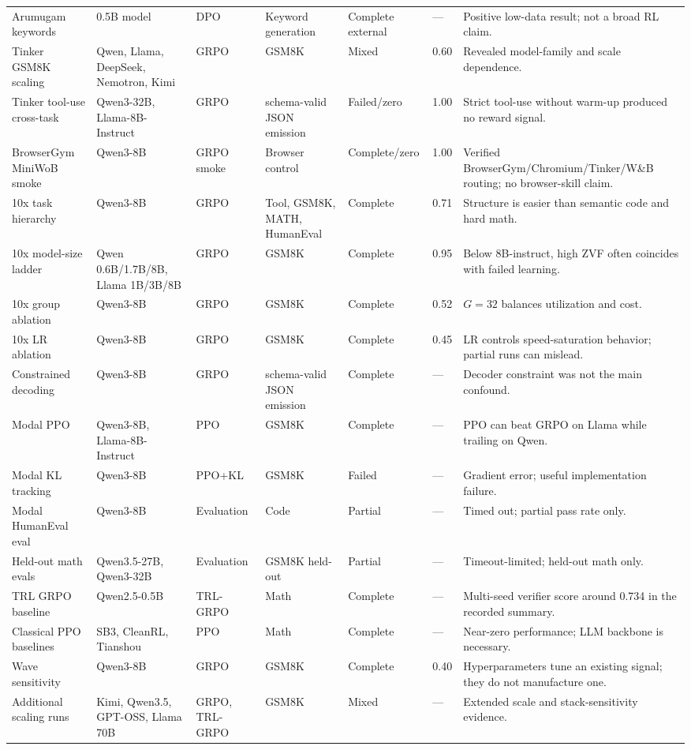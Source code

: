 \documentclass[12pt,a4paper]{report}
\begin{document}
\begin{landscape}
\begin{longtable}{p{3.2cm}p{3.0cm}p{2.5cm}p{2.2cm}p{1.8cm}p{1.5cm}p{4.8cm}}
Arumugam keywords & 0.5B model & DPO & Keyword generation & Complete external & --- & Positive low-data result; not a broad RL claim.\\
Tinker GSM8K scaling & Qwen, Llama, DeepSeek, Nemotron, Kimi & GRPO & GSM8K & Mixed & 0.60 & Revealed model-family and scale dependence.\\
Tinker tool-use cross-task & Qwen3-32B, Llama-8B-Instruct & GRPO & schema-valid JSON emission & Failed/\allowbreak zero & 1.00 & Strict tool-use without warm-up produced no reward signal.\\
BrowserGym MiniWoB smoke & Qwen3-8B & GRPO smoke & Browser control & Complete/\allowbreak zero & 1.00 & Verified BrowserGym/Chromium/Tinker/W\&B routing; no browser-skill claim.\\
10x task hierarchy & Qwen3-8B & GRPO & Tool, GSM8K, MATH, HumanEval & Complete & 0.71 & Structure is easier than semantic code and hard math.\\
10x model-size ladder & Qwen 0.6B/1.7B/8B, Llama 1B/3B/8B & GRPO & GSM8K & Complete & 0.95 & Below 8B-instruct, high ZVF often coincides with failed learning.\\
10x group ablation & Qwen3-8B & GRPO & GSM8K & Complete & 0.52 & $G=32$ balances utilization and cost.\\
10x LR ablation & Qwen3-8B & GRPO & GSM8K & Complete & 0.45 & LR controls speed-saturation behavior; partial runs can mislead.\\
Constrained decoding & Qwen3-8B & GRPO & schema-valid JSON emission & Complete & --- & Decoder constraint was not the main confound.\\
Modal PPO & Qwen3-8B, Llama-8B-Instruct & PPO & GSM8K & Complete & --- & PPO can beat GRPO on Llama while trailing on Qwen.\\
Modal KL tracking & Qwen3-8B & PPO+KL & GSM8K & Failed & --- & Gradient error; useful implementation failure.\\
Modal HumanEval eval & Qwen3-8B & Evaluation & Code & Partial & --- & Timed out; partial pass rate only.\\
Held-out math evals & Qwen3.5-27B, Qwen3-32B & Evaluation & GSM8K held-out & Partial & --- & Timeout-limited; held-out math only.\\
TRL GRPO baseline & Qwen2.5-0.5B & TRL-GRPO & Math & Complete & --- & Multi-seed verifier score around 0.734 in the recorded summary.\\
Classical PPO baselines & SB3, CleanRL, Tianshou & PPO & Math & Complete & --- & Near-zero performance; LLM backbone is necessary.\\
Wave sensitivity & Qwen3-8B & GRPO & GSM8K & Complete & 0.40 & Hyperparameters tune an existing signal; they do not manufacture one.\\
Additional scaling runs & Kimi, Qwen3.5, GPT-OSS, Llama 70B & GRPO, TRL-GRPO & GSM8K & Mixed & --- & Extended scale and stack-sensitivity evidence.\\
\bottomrule
\end{longtable}
\endgroup
\end{landscape}
\end{document}
